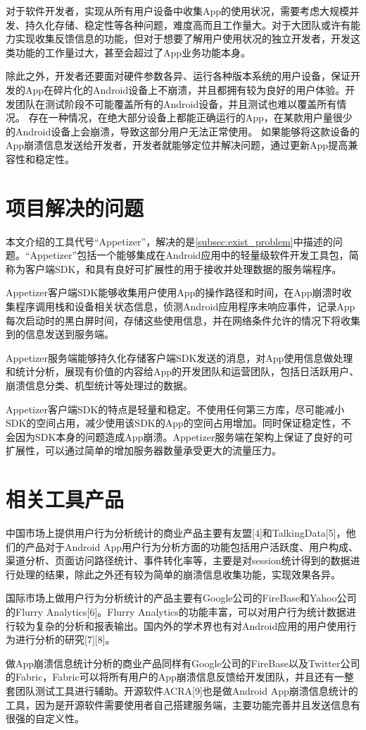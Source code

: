 对于软件开发者，实现从所有用户设备中收集App的使用状况，需要考虑大规模并发、持久化存储、稳定性等各种问题，难度高而且工作量大。对于大团队或许有能力实现收集反馈信息的功能，但对于想要了解用户使用状况的独立开发者，开发这类功能的工作量过大，甚至会超过了App业务功能本身。

除此之外，开发者还要面对硬件参数各异、运行各种版本系统的用户设备，保证开发的App在碎片化的Android设备上不崩溃，并且都拥有较为良好的用户体验。开发团队在测试阶段不可能覆盖所有的Android设备，并且测试也难以覆盖所有情况。
存在一种情况，在绝大部分设备上都能正确运行的App，在某款用户量很少的Android设备上会崩溃，导致这部分用户无法正常使用。
如果能够将这款设备的App崩溃信息发送给开发者，开发者就能够定位并解决问题，通过更新App提高兼容性和稳定性。

\section{项目解决的问题}

本文介绍的工具代号“Appetizer”，解决的是\ref{subsec:exist_problem}中描述的问题。“Appetizer”包括一个能够集成在Android应用中的轻量级软件开发工具包，简称为客户端SDK，和具有良好可扩展性的用于接收并处理数据的服务端程序。

Appetizer客户端SDK能够收集用户使用App的操作路径和时间，在App崩溃时收集程序调用栈和设备相关状态信息，侦测Android应用程序未响应事件，记录App每次启动时的黑白屏时间，存储这些使用信息，并在网络条件允许的情况下将收集到的信息发送到服务端。

Appetizer服务端能够持久化存储客户端SDK发送的消息，对App使用信息做处理和统计分析，展现有价值的内容给App的开发团队和运营团队，包括日活跃用户、崩溃信息分类、机型统计等处理过的数据。

Appetizer客户端SDK的特点是轻量和稳定。不使用任何第三方库，尽可能减小SDK的空间占用，减少使用该SDK的App的空间占用增加。同时保证稳定性，不会因为SDK本身的问题造成App崩溃。Appetizer服务端在架构上保证了良好的可扩展性，可以通过简单的增加服务器数量承受更大的流量压力。

\section{相关工具产品}

中国市场上提供用户行为分析统计的商业产品主要有友盟[4]和TalkingData[5]，他们的产品对于Android App用户行为分析方面的功能包括用户活跃度、用户构成、渠道分析、页面访问路径统计、事件转化率等，主要是对session统计得到的数据进行处理的结果，除此之外还有较为简单的崩溃信息收集功能，实现效果各异。

国际市场上做用户行为分析统计的产品主要有Google公司的FireBase和Yahoo公司的Flurry Analytics[6]。Flurry Analytics的功能丰富，可以对用户行为统计数据进行较为复杂的分析和报表输出。国内外的学术界也有对Android应用的用户使用行为进行分析的研究[7][8]。

做App崩溃信息统计分析的商业产品同样有Google公司的FireBase以及Twitter公司的Fabric，Fabric可以将所有用户的App崩溃信息反馈给开发团队，并且还有一整套团队测试工具进行辅助。开源软件ACRA[9]也是做Android App崩溃信息统计的工具，因为是开源软件需要使用者自己搭建服务端，主要功能完善并且发送信息有很强的自定义性。

